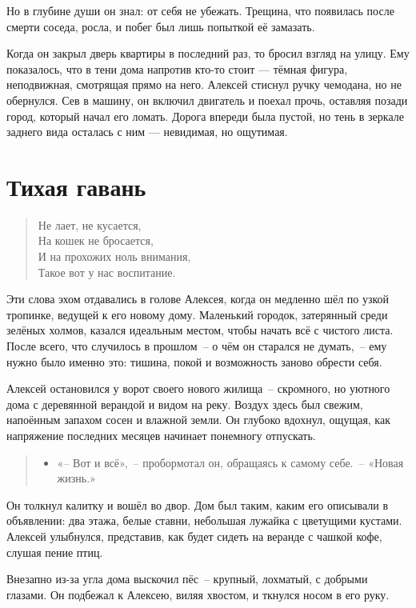 \documentclass[12pt,a4paper]{book}
\newenvironment{dialogue}{\begin{quote}\itshape\begin{itemize}\item[]}{\end{itemize}\end{quote}}
\begin{document}
Но в глубине души он знал: от себя не убежать. Трещина, что появилась после смерти соседа, росла, и побег был лишь попыткой её замазать.

Когда он закрыл дверь квартиры в последний раз, то бросил взгляд на улицу. Ему показалось, что в тени дома напротив кто-то стоит — тёмная фигура, неподвижная, смотрящая прямо на него. Алексей стиснул ручку чемодана, но не обернулся. Сев в машину, он включил двигатель и поехал прочь, оставляя позади город, который начал его ломать. Дорога впереди была пустой, но тень в зеркале заднего вида осталась с ним — невидимая, но ощутимая.

\chapter{Тихая гавань}

\begin{verse}
Не лает, не кусается,\\
На кошек не бросается,\\
И на прохожих ноль внимания,\\
Такое вот у нас воспитание.
\end{verse}

Эти слова эхом отдавались в голове Алексея, когда он медленно шёл по узкой тропинке, ведущей к его новому дому. Маленький городок, затерянный среди зелёных холмов, казался идеальным местом, чтобы начать всё с чистого листа. После всего, что случилось в прошлом~-- о чём он старался не думать,~-- ему нужно было именно это: тишина, покой и возможность заново обрести себя.

Алексей остановился у ворот своего нового жилища~-- скромного, но уютного дома с деревянной верандой и видом на реку. Воздух здесь был свежим, напоённым запахом сосен и влажной земли. Он глубоко вдохнул, ощущая, как напряжение последних месяцев начинает понемногу отпускать.

\begin{dialogue}
«-- Вот и всё»,~-- пробормотал он, обращаясь к самому себе.~-- «Новая жизнь.»
\end{dialogue}

Он толкнул калитку и вошёл во двор. Дом был таким, каким его описывали в объявлении: два этажа, белые ставни, небольшая лужайка с цветущими кустами. Алексей улыбнулся, представив, как будет сидеть на веранде с чашкой кофе, слушая пение птиц.

Внезапно из-за угла дома выскочил пёс~-- крупный, лохматый, с добрыми глазами. Он подбежал к Алексею, виляя хвостом, и ткнулся носом в его руку.
\end{document}
